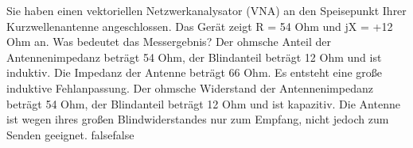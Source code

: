     {Sie haben einen vektoriellen Netzwerkanalysator (VNA) an den Speisepunkt Ihrer Kurzwellenantenne angeschlossen. Das Gerät zeigt R = 54 Ohm und jX = +12 Ohm an. Was bedeutet das Messergebnis?}
    {Der ohmsche Anteil der Antennenimpedanz beträgt 54 Ohm, der Blindanteil beträgt 12 Ohm und ist induktiv.}
    {Die Impedanz der Antenne beträgt 66 Ohm. Es entsteht eine große induktive Fehlanpassung.}
    {Der ohmsche Widerstand der Antennenimpedanz beträgt 54 Ohm, der Blindanteil beträgt 12 Ohm und ist kapazitiv.}
    {Die Antenne ist wegen ihres großen Blindwiderstandes nur zum Empfang, nicht jedoch zum Senden geeignet.}
    {false}{false}